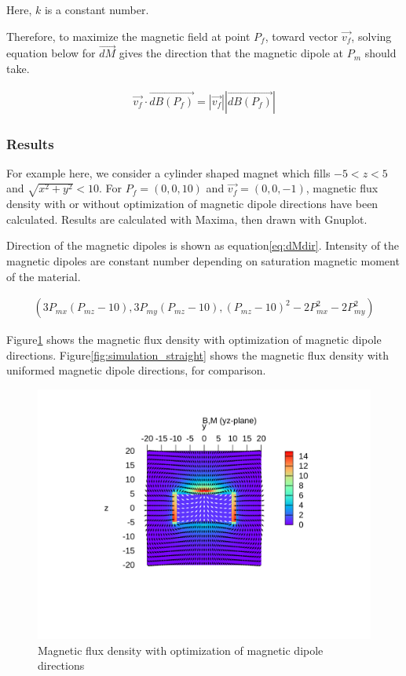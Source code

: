 \documentclass[dvipdfmx]{article}
\begin{document}
Here, $k$ is a constant number.

Therefore, to maximize the magnetic field at point $P_{f}$, toward vector $\overrightarrow{v_{f}}$,
	solving equation below for $\overrightarrow{dM}$ gives the direction that the magnetic dipole at $P_{m}$ should take.

\begin{eqnarray}
	\overrightarrow{v_{f}} \cdot \overrightarrow{dB(P_{f})} = \left| \overrightarrow{v_{f}} \right| \left| \overrightarrow{dB(P_{f})} \right|
	\label{eq:directioneq}
\end{eqnarray}


\subsubsection{Results}
For example here, we consider a cylinder shaped magnet which fills $-5<z<5$ and $\sqrt{x^2 + y^2} < 10$.
For $P_{f}=(0,0,10)$ and $\overrightarrow{v_{f}}=(0,0,-1)$, magnetic flux density with or without optimization of magnetic dipole directions have been calculated.
Results are calculated with Maxima, then drawn with Gnuplot.

Direction of the magnetic dipoles is shown as equation\ref{eq:dMdir}.
Intensity of the magnetic dipoles are constant number depending on saturation magnetic moment of the material.

\begin{eqnarray}
	\left( 3P_{mx}(P_{mz}-10), 3P_{my}(P_{mz}-10), (P_{mz}-10)^2 - 2P_{mx}^2 - 2P_{my}^2 \right)
	\label{eq:dMdir}
\end{eqnarray}

Figure\ref{fig:simulation_opt} shows the magnetic flux density with optimization of magnetic dipole directions.
Figure\ref{fig:simulation_straight} shows the magnetic flux density with uniformed magnetic dipole directions, for comparison.

\begin{figure}[htbp]
  \begin{center}
    \includegraphics[clip, width=0.9\hsize, bb=100 200 600 600]{./resources/BM.svg}
    \caption{Magnetic flux density with optimization of magnetic dipole directions}
    \label{fig:simulation_opt}
  \end{center}
\end{figure}
\end{document}
